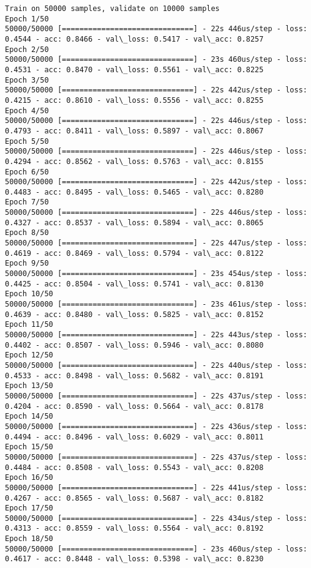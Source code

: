\documentclass[11pt]{article}
\begin{document}
    \begin{Verbatim}[commandchars=\\\{\}]
Train on 50000 samples, validate on 10000 samples
Epoch 1/50
50000/50000 [==============================] - 22s 446us/step - loss: 0.4544 - acc: 0.8466 - val\_loss: 0.5417 - val\_acc: 0.8257
Epoch 2/50
50000/50000 [==============================] - 23s 460us/step - loss: 0.4531 - acc: 0.8470 - val\_loss: 0.5561 - val\_acc: 0.8225
Epoch 3/50
50000/50000 [==============================] - 22s 442us/step - loss: 0.4215 - acc: 0.8610 - val\_loss: 0.5556 - val\_acc: 0.8255
Epoch 4/50
50000/50000 [==============================] - 22s 446us/step - loss: 0.4793 - acc: 0.8411 - val\_loss: 0.5897 - val\_acc: 0.8067
Epoch 5/50
50000/50000 [==============================] - 22s 446us/step - loss: 0.4294 - acc: 0.8562 - val\_loss: 0.5763 - val\_acc: 0.8155
Epoch 6/50
50000/50000 [==============================] - 22s 442us/step - loss: 0.4483 - acc: 0.8495 - val\_loss: 0.5465 - val\_acc: 0.8280
Epoch 7/50
50000/50000 [==============================] - 22s 446us/step - loss: 0.4327 - acc: 0.8537 - val\_loss: 0.5894 - val\_acc: 0.8065
Epoch 8/50
50000/50000 [==============================] - 22s 447us/step - loss: 0.4619 - acc: 0.8469 - val\_loss: 0.5794 - val\_acc: 0.8122
Epoch 9/50
50000/50000 [==============================] - 23s 454us/step - loss: 0.4425 - acc: 0.8504 - val\_loss: 0.5741 - val\_acc: 0.8130
Epoch 10/50
50000/50000 [==============================] - 23s 461us/step - loss: 0.4639 - acc: 0.8480 - val\_loss: 0.5825 - val\_acc: 0.8152
Epoch 11/50
50000/50000 [==============================] - 22s 443us/step - loss: 0.4402 - acc: 0.8507 - val\_loss: 0.5946 - val\_acc: 0.8080
Epoch 12/50
50000/50000 [==============================] - 22s 440us/step - loss: 0.4533 - acc: 0.8498 - val\_loss: 0.5682 - val\_acc: 0.8191
Epoch 13/50
50000/50000 [==============================] - 22s 437us/step - loss: 0.4204 - acc: 0.8590 - val\_loss: 0.5664 - val\_acc: 0.8178
Epoch 14/50
50000/50000 [==============================] - 22s 436us/step - loss: 0.4494 - acc: 0.8496 - val\_loss: 0.6029 - val\_acc: 0.8011
Epoch 15/50
50000/50000 [==============================] - 22s 437us/step - loss: 0.4484 - acc: 0.8508 - val\_loss: 0.5543 - val\_acc: 0.8208
Epoch 16/50
50000/50000 [==============================] - 22s 441us/step - loss: 0.4267 - acc: 0.8565 - val\_loss: 0.5687 - val\_acc: 0.8182
Epoch 17/50
50000/50000 [==============================] - 22s 434us/step - loss: 0.4313 - acc: 0.8559 - val\_loss: 0.5564 - val\_acc: 0.8192
Epoch 18/50
50000/50000 [==============================] - 23s 460us/step - loss: 0.4617 - acc: 0.8448 - val\_loss: 0.5398 - val\_acc: 0.8230

\end{Verbatim}
\end{document}

